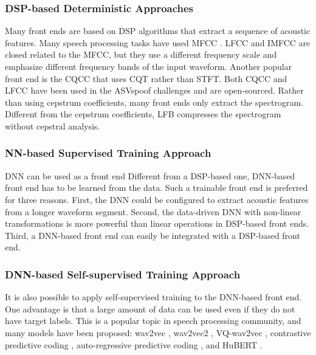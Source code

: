 \subsubsection{DSP-based Deterministic Approaches}

Many front ends are based on \ac{DSP} algorithms that extract a sequence of acoustic features. Many speech processing tasks have used \ac{MFCC} \cite{davis1980comparison}. \ac{LFCC} \cite{davis1980comparison} and \ac{IMFCC} are closed related to the MFCC, but they use a different frequency scale and emphasize different frequency bands of the input waveform. Another popular front end is the \ac{CQCC} that uses \ac{CQT} rather than \ac{STFT}. Both \acs{CQCC} and \acs{LFCC} have been used in the ASVspoof challenges and are open-sourced. Rather than using cepstrum coefficients, many front ends only extract the spectrogram. Different from the cepstrum coefficients, \ac{LFB} compresses the spectrogram without cepstral analysis\cite{wang2022practical}.

\subsubsection{NN-based Supervised Training Approach}

\ac{DNN} can be used as a front end Different from a DSP-based one,  DNN-based front end has to be learned from the data. Such a trainable front end is preferred for three reasons. First, the DNN could be configured to extract acoustic features from a longer waveform segment. Second, the data-driven DNN with non-linear transformations is more powerful than linear operations in DSP-based front ends. Third, a DNN-based front end can easily be integrated with a DSP-based front end\cite{wang2022practical}. 

\subsubsection{DNN-based Self-supervised Training Approach}

It is also possible to apply self-supervised training to the DNN-based front end. One advantage is that a large amount of data can be used even if they do not have target labels. This is a popular topic in speech processing community, and many models have been proposed: wav2vec \cite{schneider2019wav2vec}, wav2vec2 \cite{baevski2020wav2vec}, VQ-wav2vec \cite{baevski2019vq},
contrastive predictive coding \cite{chung2021similarity}, auto-regressive predictive coding \cite{chung2021similarity}, and
HuBERT \cite{hsu2021hubert, wang2022practical}. 


